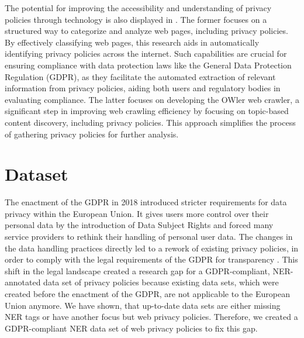 \documentclass[a4paper,
               biblatex,     %
               hyphens,      %
               ]{jacow}
\begin{document}
The potential for improving the accessibility and understanding of privacy policies through technology is also displayed in \cite{alcomprehensive, dinzingerowler}. The former focuses on a structured way to categorize and analyze web pages, including privacy policies. By effectively classifying web pages, this research aids in automatically identifying privacy policies across the internet. Such capabilities are crucial for ensuring compliance with data protection laws like the General Data Protection Regulation (GDPR), as they facilitate the automated extraction of relevant information from privacy policies, aiding both users and regulatory bodies in evaluating compliance. The latter focuses on developing the OWler web crawler, a significant step in improving web crawling efficiency by focusing on topic-based content discovery, including privacy policies. This approach simplifies the process of gathering privacy policies for further analysis.

\section{Dataset}\label{section:dataset}
The enactment of the GDPR in 2018 introduced stricter requirements for data privacy within the European Union.
It gives users more control over their personal data by the introduction of Data Subject Rights \cite[Art. 12 - Art. 23]{GDPR} and forced many service providers to rethink their handling of personal user data. 
The changes in the data handling practices directly led to a rework of existing privacy policies, in order to comply with the legal requirements of the GDPR for transparency \cite[Art. 5]{GDPR}.
This shift in the legal landscape created a research gap for a GDPR-compliant, NER-annotated data set of privacy policies because existing data sets, which were created before the enactment of the GDPR, are not applicable to the European Union anymore. 
We have shown, that up-to-date data sets are either missing NER tags or have another focus but web privacy policies.
Therefore, we created a GDPR-compliant NER data set of web privacy policies to fix this gap. 
\end{document}
